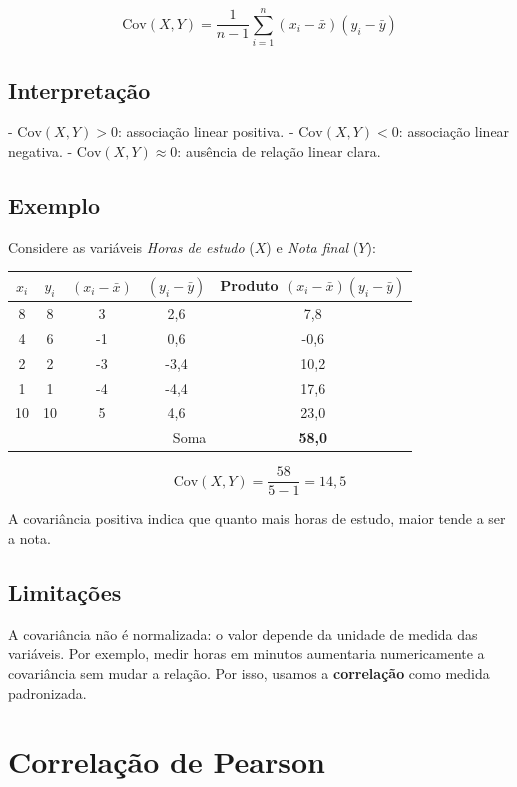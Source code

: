\begin{FormulaBox}
\[
\mathrm{Cov}(X,Y)=\dfrac{1}{n-1}\sum_{i=1}^n (x_i-\bar{x})(y_i-\bar{y})
\]
\end{FormulaBox}

\subsection*{Interpretação}
- $\mathrm{Cov}(X,Y)>0$: associação linear positiva.  
- $\mathrm{Cov}(X,Y)<0$: associação linear negativa.  
- $\mathrm{Cov}(X,Y)\approx 0$: ausência de relação linear clara.

\subsection*{Exemplo}
Considere as variáveis \emph{Horas de estudo} ($X$) e \emph{Nota final} ($Y$):

\begin{center}
\begin{tabular}{@{}c|c|c|c|c@{}}\toprule
$x_i$ & $y_i$ & $(x_i-\bar{x})$ & $(y_i-\bar{y})$ & Produto $(x_i-\bar{x})(y_i-\bar{y})$ \\\midrule
8 & 8  & 3   & 2,6  & 7,8 \\
4 & 6  & -1  & 0,6  & -0,6 \\
2 & 2  & -3  & -3,4 & 10,2 \\
1 & 1  & -4  & -4,4 & 17,6 \\
10& 10 & 5   & 4,6  & 23,0 \\\midrule
\multicolumn{4}{r|}{Soma} & \textbf{58,0} \\\bottomrule
\end{tabular}
\end{center}

\[
\mathrm{Cov}(X,Y)=\frac{58}{5-1}=14,5
\]

A covariância positiva indica que quanto mais horas de estudo, maior tende a ser a nota.

\subsection*{Limitações}
A covariância não é normalizada: o valor depende da unidade de medida das variáveis.  
Por exemplo, medir horas em minutos aumentaria numericamente a covariância sem mudar a relação.  
Por isso, usamos a \textbf{correlação} como medida padronizada.

\section{Correlação de Pearson}
